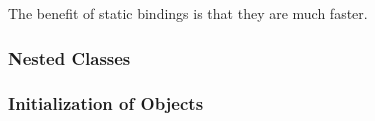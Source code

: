 The benefit of static bindings is that they are much faster.

\subsubsection{Nested Classes}\label{subsubsec:OOP_Nested_Classes}
\subsubsection{Initialization of Objects}\label{subsubsec:OOP_Object_Initialization}

